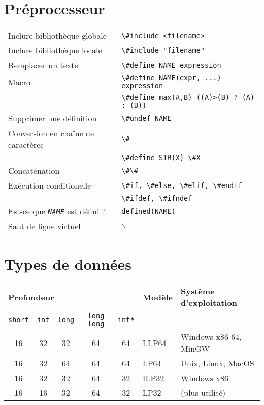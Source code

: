 \documentclass{article}
\newcommand{\bs}{$\backslash$}
\newcommand{\NAME}{\emph{NAME}}
\newcommand{\cd}{\lstinline}
\begin{document}
\begin{multicols*}{3}
\section*{Préprocesseur}
\begin{tabularx}{\linewidth}{Xl}
  Inclure bibliothèque globale       & \cd{\#include <filename>} \\
  Inclure bibliothèque locale        & \cd{\#include "filename"} \\
  Remplacer un texte                 & \cd{\#define NAME expression} \\
  Macro                              & \cd{\#define NAME(expr, ...) expression} \\
                                     & \cd{\#define max(A,B) ((A)>(B) ? (A) : (B))} \\
  Supprimer une définition           & \cd{\#undef NAME} \\
  Conversion en chaîne de caractères & \cd{\#} \\
                                     & \cd{\#define STR(X) \#X} \\
  Concaténation                      & \cd{\#\#} \\
  Exécution conditionelle            & \cd{\#if, \#else, \#elif, \#endif} \\
                                     & \cd{\#ifdef, \#ifndef} \\
  Est-ce que \texttt{\NAME} est défini ? & \cd{defined(NAME)} \\
  Saut de ligne virtuel              & \bs
\end{tabularx}

\section*{Types de données}

\begin{tabularx}{\linewidth}{ccccclX}
  \multicolumn{5}{l}{\bf Profondeur} & \bf Modèle & \bf Système d'exploitation \\
  \cd {short} & \cd{int} & \cd{long} & \cd{long long} & \cd{int*} & & \\
  \hline
  16 & 32 & 32 & 64 & 64 & LLP64 & Windows x86-64, MinGW \\
  16 & 32 & 64 & 64 & 64 & LP64 & Unix, Linux, MacOS \\
  16 & 32 & 32 & 64 & 32 & ILP32 & Windows x86 \\
  16 & 16 & 32 & 64 & 32 & LP32 & (plus utilisé) \\
\end{tabularx}


\end{multicols*}
\end{document}
